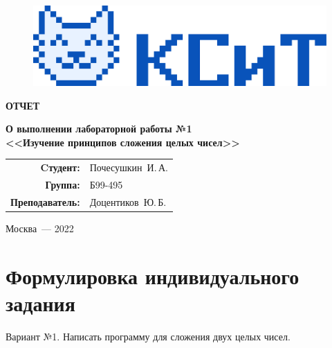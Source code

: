 \documentclass[12pt,a4paper,oneside]{article}
\begin{document}
\begin{titlepage}
\begin{center}
\begin{figure}[H]
\begin{minipage}[c]{0.3\textwidth}
        \end{minipage}
        \hfill
        \begin{minipage}[c]{0.3\textwidth}
          \includegraphics[width=\textwidth]{logo_department}
        \end{minipage}
      \end{figure}
  
      \vspace{4cm}
  
      \begin{huge}
        \textbf{ОТЧЕТ}
      \end{huge}
  
      \begin{large}
        \textbf{О выполнении лабораторной работы №1 \\
          <<Изучение принципов сложения целых чисел>>}
      \end{large}
      
      \vfill
      
      \begin{flushright}
        \begin{tabular}{ r l }
          \textbf{Cтудент:} & Почесушкин~И.\,А. \\ 
          \textbf{Группа:} & Б99-495 \\  
          \textbf{Преподаватель:} & Доцентиков~Ю.\,Б. \\
        \end{tabular}
      \end{flushright}
              
      Москва~--- 2022
    \end{center}
  \end{titlepage}

\setcounter{page}{2}

\section{Формулировка индивидуального задания}

Вариант №1. Написать программу для сложения двух целых чисел.
\end{document}
